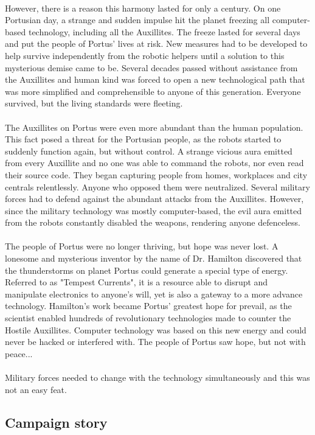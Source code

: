 \documentclass[../Main.tex]{subfiles}
\begin{document}
\paragraph{}
However, there is a reason this harmony lasted for only a century. On one Portusian day, a strange and sudden impulse hit the planet freezing all computer-based technology, including all the Auxillites. The freeze lasted for several days and put the people of Portus' lives at risk. New measures had to be developed to help survive independently from the robotic helpers until a solution to this mysterious demise came to be. Several decades passed without assistance from the Auxillites and human kind was forced to open a new technological path that was more simplified and comprehensible to anyone of this generation. Everyone survived, but the living standards were fleeting.

\paragraph{}
The Auxillites on Portus were even more abundant than the human population. This fact posed a threat for the Portusian people, as the robots started to suddenly function again, but without control. A strange vicious aura emitted from every Auxillite and no one was able to command the robots, nor even read their source code. They began capturing people from homes, workplaces and city centrals relentlessly. Anyone who opposed them were neutralized. Several military forces had to defend against the abundant attacks from the Auxillites. However, since the military technology was mostly computer-based, the evil aura emitted from the robots constantly disabled the weapons, rendering anyone defenceless. 

\paragraph{}
The people of Portus were no longer thriving, but hope was never lost. A lonesome and mysterious inventor by the name of Dr. Hamilton discovered that the thunderstorms on planet Portus could generate a special type of energy. Referred to as "Tempest Currents", it is a resource able to disrupt and manipulate electronics to anyone's will, yet is also a gateway to a more advance technology. Hamilton's work became Portus' greatest hope for prevail, as the scientist enabled hundreds of revolutionary technologies made to counter the Hostile Auxillites. Computer technology was based on this new energy and could never be hacked or interfered with. The people of Portus saw hope, but not with peace...

\paragraph{}
Military forces needed to change with the technology simultaneously and this was not an easy feat. 

\subsection{Campaign story}
\end{document}
